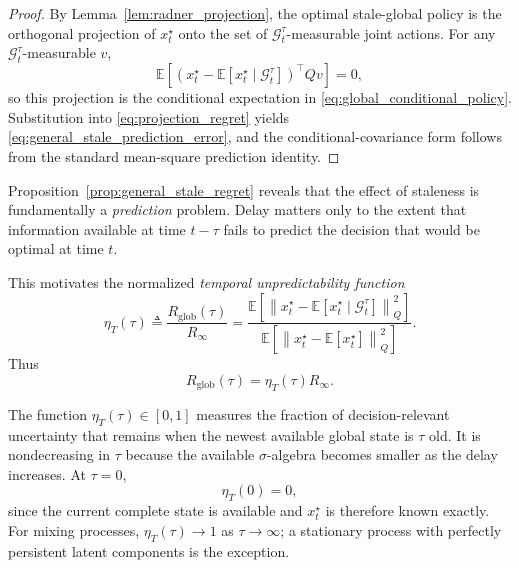 \documentclass[11pt]{article}
\begin{document}
\begin{proof}
By Lemma~\ref{lem:radner_projection}, the optimal stale-global policy is the
orthogonal projection of $x_t^\star$ onto the set of
$\mathcal{G}^{\tau}_t$-measurable joint actions. For any
$\mathcal{G}^{\tau}_t$-measurable $v$,
\[
    \mathbb{E}
    \left[
        \left(
            x_t^\star
            -
            \mathbb{E}[x_t^\star\mid\mathcal{G}^{\tau}_t]
        \right)^\top
        Qv
    \right]
    =0,
\]
so this projection is the conditional expectation in
\eqref{eq:global_conditional_policy}. Substitution into
\eqref{eq:projection_regret} yields
\eqref{eq:general_stale_prediction_error}, and the conditional-covariance form
follows from the standard mean-square prediction identity.
\end{proof}

Proposition~\ref{prop:general_stale_regret} reveals that the effect of
staleness is fundamentally a \emph{prediction} problem. Delay matters only to
the extent that information available at time $t-\tau$ fails to predict the
decision that would be optimal at time $t$.

This motivates the normalized \emph{temporal unpredictability function}
\begin{equation}
    \eta_T(\tau)
    \triangleq
    \frac{R_{\mathrm{glob}}(\tau)}{R_\infty}
    =
    \frac{
        \mathbb{E}
        \left[
            \left\|
                x_t^\star-
                \mathbb{E}[x_t^\star\mid\mathcal{G}^{\tau}_t]
            \right\|_Q^2
        \right]
    }{
        \mathbb{E}
        \left[
            \left\|
                x_t^\star-\mathbb{E}[x_t^\star]
            \right\|_Q^2
        \right]
    }.
    \label{eq:temporal_unpredictability}
\end{equation}
Thus
\begin{equation}
    R_{\mathrm{glob}}(\tau)
    =
    \eta_T(\tau)R_\infty.
    \label{eq:Rglob_etaT}
\end{equation}

The function $\eta_T(\tau)\in[0,1]$ measures the fraction of
decision-relevant uncertainty that remains when the newest available global
state is $\tau$ old. It is nondecreasing in $\tau$ because the available
$\sigma$-algebra becomes smaller as the delay increases. At $\tau=0$,
\begin{equation}
    \eta_T(0)=0,
\end{equation}
since the current complete state is available and $x_t^\star$ is therefore
known exactly. For mixing processes,
$\eta_T(\tau)\rightarrow1$ as $\tau\rightarrow\infty$; a stationary process
with perfectly persistent latent components is the exception.
\end{document}
